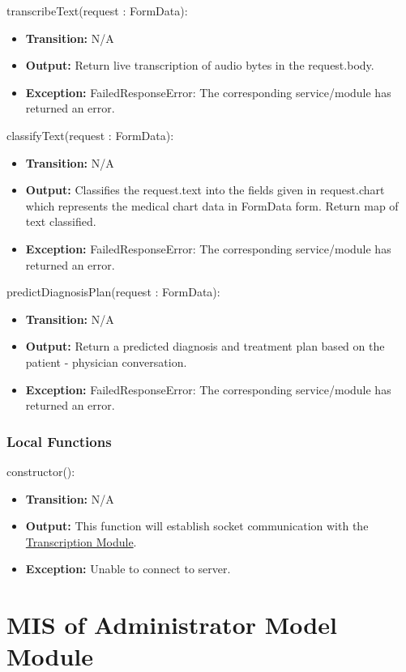 \documentclass[12pt, titlepage]{article}
\begin{document}
\noindent transcribeText(request : FormData):
\begin{itemize}
    \item \textbf{Transition:} N/A
    \item \textbf{Output:} Return live transcription of audio bytes in the request.body.
    \item \textbf{Exception:} FailedResponseError: The corresponding service/module has returned an error.
\end{itemize}

\noindent classifyText(request : FormData):
\begin{itemize}
    \item \textbf{Transition:} N/A
    \item \textbf{Output:} Classifies the request.text into the fields given in request.chart which represents the medical chart data in FormData form. Return map of text classified. 
    \item \textbf{Exception:} FailedResponseError: The corresponding service/module has returned an error.
\end{itemize}

\noindent predictDiagnosisPlan(request : FormData):
\begin{itemize}
    \item \textbf{Transition:} N/A
    \item \textbf{Output:} Return a predicted diagnosis and treatment plan based on the patient - physician conversation.
    \item \textbf{Exception:} FailedResponseError: The corresponding service/module has returned an error.
\end{itemize}


\subsubsection{Local Functions}

\noindent constructor():
\begin{itemize}
    \item \textbf{Transition:} N/A
    \item \textbf{Output:} This function will establish socket communication with the \hyperref[Transcription_Module]{Transcription Module}.
    \item \textbf{Exception:} Unable to connect to server.
\end{itemize}

\newpage

\section{MIS of Administrator Model Module } \label{Admin_Model_Module}
\end{document}
